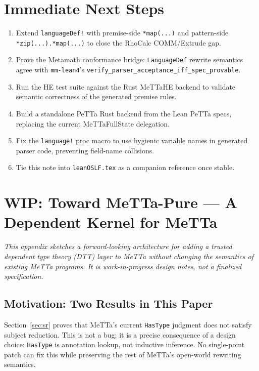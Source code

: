 \documentclass[11pt]{article}
\newcommand{\code}[1]{\texttt{#1}}
\begin{document}
\section{Immediate Next Steps}

\begin{enumerate}
\item Extend \code{languageDef!} with premise-side \code{*map(...)} and
  pattern-side \code{*zip(...).*map(...)} to close the RhoCalc COMM/Extrude gap.
\item Prove the Metamath conformance bridge: \code{LanguageDef} rewrite semantics
  agree with \code{mm-lean4}'s \code{verify\_parser\_acceptance\_iff\_spec\_provable}.
\item Run the HE test suite against the Rust MeTTaHE backend to validate
  semantic correctness of the generated premise rules.
\item Build a standalone PeTTa Rust backend from the Lean PeTTa specs,
  replacing the current MeTTaFullState delegation.
\item Fix the \code{language!} proc macro to use hygienic variable names
  in generated parser code, preventing field-name collisions.
\item Tie this note into \code{leanOSLF.tex} as a companion reference once stable.
\end{enumerate}

\appendix
\section{WIP: Toward MeTTa-Pure --- A Dependent Kernel for MeTTa}
\label{app:metta-dtt}

\emph{This appendix sketches a forward-looking architecture for adding a
trusted dependent type theory (DTT) layer to MeTTa without changing the
semantics of existing MeTTa programs. It is work-in-progress design notes,
not a finalized specification.}

\subsection{Motivation: Two Results in This Paper}

Section~\ref{sec:sr} proves that MeTTa's current \code{HasType} judgment does
not satisfy subject reduction. This is not a bug; it is a precise consequence
of a design choice: \code{HasType} is annotation lookup, not inductive
inference. No single-point patch can fix this while preserving the rest of
MeTTa's open-world rewriting semantics.
\end{document}
